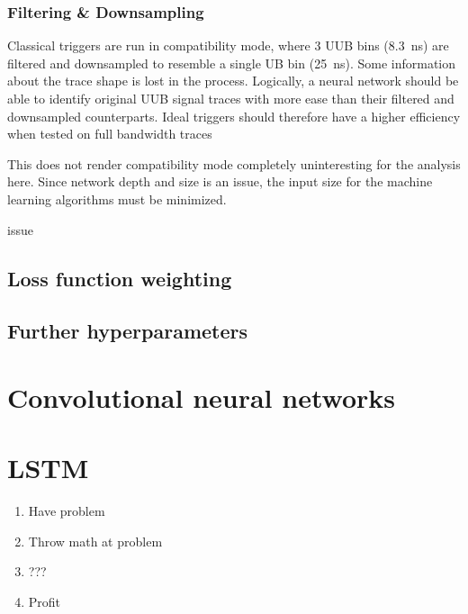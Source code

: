 \subsubsection{Filtering \& Downsampling}
\label{sssec:filtering-and-downsampling}

Classical triggers are run in compatibility mode, where 3 UUB bins (\SI{8.3}{\nano\second}) are filtered and downsampled to resemble a single UB bin 
(\SI{25}{\nano\second}). Some information about the trace shape is lost in the process. Logically, a neural network should be able to identify original UUB signal 
traces with more ease than their filtered and downsampled counterparts. Ideal triggers should therefore have a higher efficiency when tested on full bandwidth 
traces

This does not render compatibility mode completely uninteresting for the analysis here. Since network depth and size is an issue, the input size for the machine 
learning algorithms must be minimized. 

issue

\subsection{Loss function weighting}
\label{ssec:loss-function-weighting}



\subsubsection{}

\subsection{Further hyperparameters}
\label{ssec:hyperparameters}





\section{Convolutional neural networks}


\section{LSTM}

\begin{enumerate}
    \item Have problem
    \item Throw math at problem
    \item ???
    \item Profit
\end{enumerate}


